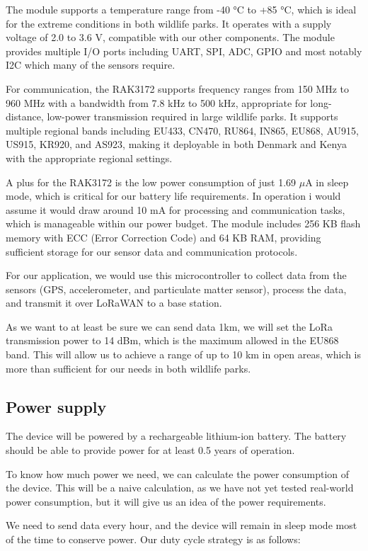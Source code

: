 The module supports a temperature range from -40 °C to +85 °C, which is ideal for the extreme conditions in both wildlife parks. It operates with a supply voltage of 2.0 to 3.6 V, compatible with our other components. The module provides multiple I/O ports including UART, SPI, ADC, GPIO and most notably I2C which many of the sensors require.

For communication, the RAK3172 supports frequency ranges from 150 MHz to 960 MHz with a bandwidth from 7.8 kHz to 500 kHz, appropriate for long-distance, low-power transmission required in large wildlife parks. It supports multiple regional bands including EU433, CN470, RU864, IN865, EU868, AU915, US915, KR920, and AS923, making it deployable in both Denmark and Kenya with the appropriate regional settings.

A plus for the RAK3172 is the low power consumption of just 1.69 $\mu$A in sleep mode, which is critical for our battery life requirements. In operation i would assume it would draw around 10 mA for processing and communication tasks, which is manageable within our power budget. The module includes 256 KB flash memory with ECC (Error Correction Code) and 64 KB RAM, providing sufficient storage for our sensor data and communication protocols.

For our application, we would use this microcontroller to collect data from the sensors (GPS, accelerometer, and particulate matter sensor), process the data, and transmit it over LoRaWAN to a base station.

As we want to at least be sure we can send data 1km, we will set the LoRa transmission power to 14 dBm, which is the maximum allowed in the EU868 band. This will allow us to achieve a range of up to 10 km in open areas, which is more than sufficient for our needs in both wildlife parks.

\subsection{Power supply}
The device will be powered by a rechargeable lithium-ion battery. The battery should be able to provide power for at least 0.5 years of operation.

To know how much power we need, we can calculate the power consumption of the device. This will be a naive calculation, as we have not yet tested real-world power consumption, but it will give us an idea of the power requirements.

We need to send data every hour, and the device will remain in sleep mode most of the time to conserve power. Our duty cycle strategy is as follows:

